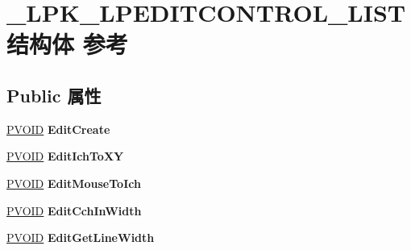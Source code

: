 \hypertarget{struct___l_p_k___l_p_e_d_i_t_c_o_n_t_r_o_l___l_i_s_t}{}\section{\+\_\+\+L\+P\+K\+\_\+\+L\+P\+E\+D\+I\+T\+C\+O\+N\+T\+R\+O\+L\+\_\+\+L\+I\+S\+T结构体 参考}
\label{struct___l_p_k___l_p_e_d_i_t_c_o_n_t_r_o_l___l_i_s_t}
\subsection*{Public 属性}
\begin{DoxyCompactItemize}
\item 
\mbox{\label{struct___l_p_k___l_p_e_d_i_t_c_o_n_t_r_o_l___l_i_s_t_a20d981a033fdc634c1dd9aeba6f3aeb6}} 
\hyperlink{interfacevoid}{P\+V\+O\+ID} {\bfseries Edit\+Create}
\item 
\mbox{\label{struct___l_p_k___l_p_e_d_i_t_c_o_n_t_r_o_l___l_i_s_t_af358bd7519255cee6141b6bdda47bed2}} 
\hyperlink{interfacevoid}{P\+V\+O\+ID} {\bfseries Edit\+Ich\+To\+XY}
\item 
\mbox{\label{struct___l_p_k___l_p_e_d_i_t_c_o_n_t_r_o_l___l_i_s_t_a8584a3432e0951e75686c7d38e0ba885}} 
\hyperlink{interfacevoid}{P\+V\+O\+ID} {\bfseries Edit\+Mouse\+To\+Ich}
\item 
\mbox{\label{struct___l_p_k___l_p_e_d_i_t_c_o_n_t_r_o_l___l_i_s_t_a7958329130049c02afdcb283b1528ea1}} 
\hyperlink{interfacevoid}{P\+V\+O\+ID} {\bfseries Edit\+Cch\+In\+Width}
\item 
\mbox{\label{struct___l_p_k___l_p_e_d_i_t_c_o_n_t_r_o_l___l_i_s_t_a6275bc394b349308d00395e57eee93b5}} 
\hyperlink{interfacevoid}{P\+V\+O\+ID} {\bfseries Edit\+Get\+Line\+Width}
\item 
\mbox{\label{struct___l_p_k___l_p_e_d_i_t_c_o_n_t_r_o_l___l_i_s_t_ab6361c80d489b3335fdbcd200b7a50fe}} 

\end{DoxyCompactItemize}

